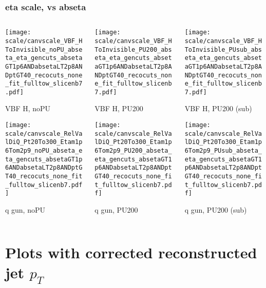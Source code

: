 \documentclass[8pt]{beamer}
\begin{document}
  \begin{frame}
  \frametitle{eta scale, vs abseta}
  
  \begin{columns}
   \begin{column}{0.35\textwidth}
     \texttt{[image: scale/canvscale\_VBF\_HToInvisible\_noPU\_abseta\_eta\_gencuts\_absetaGT1p6ANDabsetaLT2p8ANDptGT40\_recocuts\_none\_fit\_fulltow\_slicenb7.pdf]}
     
     VBF H, noPU
    
     \texttt{[image: scale/canvscale\_RelValDiQ\_Pt20To300\_Etam1p6Tom2p9\_noPU\_abseta\_eta\_gencuts\_absetaGT1p6ANDabsetaLT2p8ANDptGT40\_recocuts\_none\_fit\_fulltow\_slicenb7.pdf]}
     
     q gun, noPU
   \end{column}
   \begin{column}{0.35\textwidth}
     \texttt{[image: scale/canvscale\_VBF\_HToInvisible\_PU200\_abseta\_eta\_gencuts\_absetaGT1p6ANDabsetaLT2p8ANDptGT40\_recocuts\_none\_fit\_fulltow\_slicenb7.pdf]}
     
     VBF H, PU200
    
     \texttt{[image: scale/canvscale\_RelValDiQ\_Pt20To300\_Etam1p6Tom2p9\_PU200\_abseta\_eta\_gencuts\_absetaGT1p6ANDabsetaLT2p8ANDptGT40\_recocuts\_none\_fit\_fulltow\_slicenb7.pdf]}
     
     q gun, PU200
   \end{column}
   \begin{column}{0.35\textwidth}
     \texttt{[image: scale/canvscale\_VBF\_HToInvisible\_PUsub\_abseta\_eta\_gencuts\_absetaGT1p6ANDabsetaLT2p8ANDptGT40\_recocuts\_none\_fit\_fulltow\_slicenb7.pdf]}
     
     VBF H, PU200 (sub)
    
     \texttt{[image: scale/canvscale\_RelValDiQ\_Pt20To300\_Etam1p6Tom2p9\_PUsub\_abseta\_eta\_gencuts\_absetaGT1p6ANDabsetaLT2p8ANDptGT40\_recocuts\_none\_fit\_fulltow\_slicenb7.pdf]}
     
     q gun, PU200 (sub)
   \end{column}
  \end{columns}
 \end{frame}
 
 \section{Plots with corrected reconstructed jet $p_{T}$}
 
\end{document}

